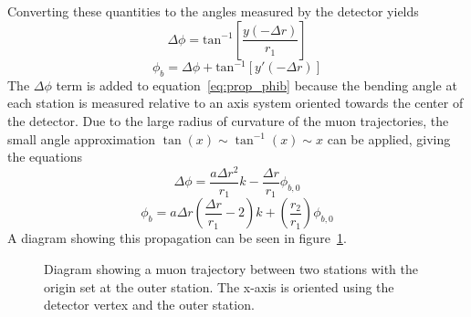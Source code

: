 Converting these quantities to the angles measured by the detector yields
\begin{equation}
	\label{eq:prop_phi}
	\Delta\phi=\mathrm{tan}^{-1}\left[\frac{y(-\Delta r)}{r_1}\right]
\end{equation}
\begin{equation}
	\label{eq:prop_phib}
	\phi_b=\Delta\phi+\mathrm{tan}^{-1}\left[y'(-\Delta r)\right]
\end{equation}
The $\Delta\phi$ term is added to equation~\ref{eq:prop_phib} because the bending angle at each station is measured relative to an axis system oriented towards the center of the detector. Due to the large radius of curvature of the muon trajectories, the small angle approximation $\tan(x)\sim \tan^{-1}(x)\sim x$ can be applied, giving the equations
\begin{equation}
	\label{eq:prop_phi_approx}
	\Delta\phi=\frac{a\Delta r^2}{r_1}k-\frac{\Delta r}{r_1}\phi_{b,0}
\end{equation}
\begin{equation}
	\label{eq:prop_phib_approx}
	\phi_b=a\Delta r\left(\frac{\Delta r}{r_1}-2\right)k+\left(\frac{r_2}{r_1}\right)\phi_{b,0}
\end{equation}
A diagram showing this propagation can be seen in figure~\ref{fig:mu_trajectory}.

\begin{figure}[h!]
	\centering
	
	\caption{Diagram showing a muon trajectory between two stations with the origin set at the outer station. The x-axis is oriented using the detector vertex and the outer station.}
	\label{fig:mu_trajectory}
\end{figure}

